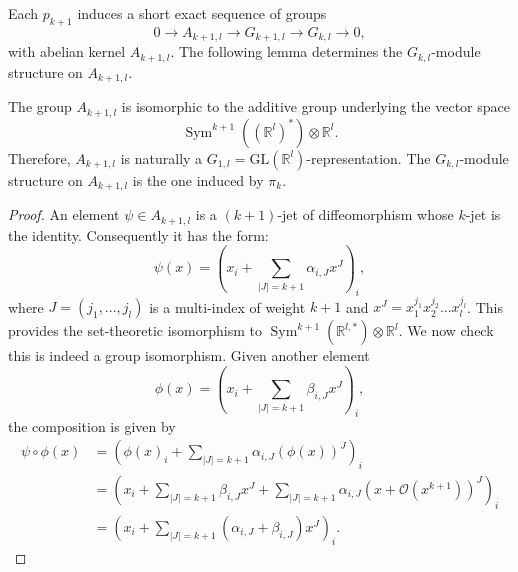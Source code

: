 \documentclass[10pt]{amsart}
\newcommand{\rr}{\mathbb{R}}
\DeclareMathOperator{\Sym}{Sym}
\numberwithin{theoremalpha}{section}
\numberwithin{equation}{section}
\numberwithin{definition}{section}
\numberwithin{theorem}{section}
\numberwithin{proposition}{section}
\numberwithin{lemma}{section}
\numberwithin{example}{section}
\numberwithin{remark}{section}
\numberwithin{corollary}{section}
\numberwithin{question}{section}
\numberwithin{problem}{section}
\numberwithin{assumption}{section}
\theoremstyle{named}
\numberwithin{equation}{section}
\begin{document}
Each $p_{k+1}$ induces a short exact sequence of groups
\begin{equation}\label{eq:groupseq}
0 \rightarrow A_{k+1,l} \rightarrow G_{k+1,l} \rightarrow G_{k,l} \rightarrow 0,
\end{equation}
with abelian kernel $A_{k+1, l}$. The following lemma determines the $G_{k,l}$-module structure on $A_{k+1, l}$.  
\begin{lemma} \label{modulestructure}
The group $A_{k+1, l}$ is isomorphic to the additive group underlying the vector space 
\[
\Sym^{k+1}((\rr^{l})^*) \otimes \rr^l.
\]
 Therefore, $A_{k+1, l}$ is naturally a $G_{1,l} = \mathrm{GL}(\rr^l)$-representation. The $G_{k,l}$-module structure on $A_{k+1,l}$ is the one induced by $\pi_{k}$. 
\end{lemma}
\begin{proof}
An element $\psi \in A_{k+1,l}$ is a $(k+1)$-jet of diffeomorphism whose $k$-jet is the identity. Consequently it has the form: 
\[
\psi(x) = (x_{i} + \sum_{|J| = k+1} \alpha_{i, J} x^{J} )_{i},
\]
where $J = (j_{1}, ..., j_{l})$ is a multi-index of weight $k +1$ and $x^{J} = x_1^{j_{1}} x_2^{j_{2}} ... x_l^{j_{l}}$. This provides the set-theoretic isomorphism to $\Sym^{k+1}(\rr^{l,*}) \otimes \rr^l$. We now check this is indeed a group isomorphism. Given another element 
\[
\phi(x) = (x_{i} + \sum_{|J| = k+1} \beta_{i, J} x^{J} )_{i},
\]
the composition is given by 
\begin{align*}
\psi \circ \phi(x) &= ( \phi(x)_{i} +  \sum_{|J| = k+1} \alpha_{i, J} (\phi(x))^{J})_{i} \\
&= (x_{i} + \sum_{|J| = k+1} \beta_{i, J} x^{J} +  \sum_{|J| = k+1} \alpha_{i, J} (x + \mathcal{O}(x^{k+1}))^{J})_{i} \\
&= (x_{i} + \sum_{|J| = k+1}( \alpha_{i,J} + \beta_{i, J}) x^{J})_{i}.
\end{align*}


\end{proof}
\end{document}
